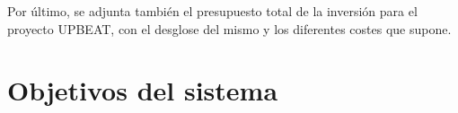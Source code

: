 \documentclass{article}
\begin{document}
Por último, se adjunta también el presupuesto total de la inversión para el proyecto UPBEAT, con el desglose del mismo y los diferentes costes que supone.

\newpage
\tableofcontents %
{}
\newpage
\pagestyle{fancy}
\section{Objetivos del sistema}
\end{document}
